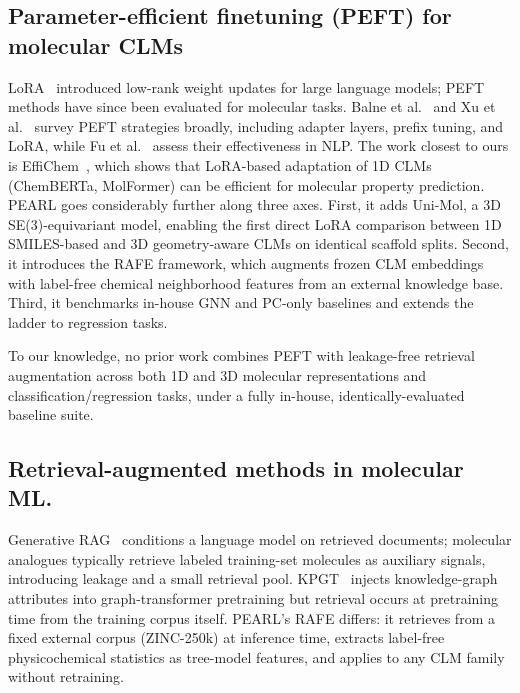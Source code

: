 \documentclass[final,1p,times]{elsarticle}
\begin{document}
\subsection{Parameter-efficient finetuning (PEFT) for molecular CLMs} \label{PEFT}
LoRA~\cite{hu2021lora} introduced low-rank weight updates for large language models; PEFT methods have since been evaluated for molecular tasks.
Balne et al.~\cite{balne2024peft} and Xu et al.~\cite{xu2023peftreview} survey PEFT strategies broadly, including adapter layers, prefix tuning, and LoRA, while
Fu et al.~\cite{fu2023effectiveness} assess their effectiveness in NLP.
The work closest to ours is EffiChem~\cite{harod2025effichem}, which shows that LoRA-based adaptation of 1D CLMs (ChemBERTa, MolFormer) can be efficient for molecular property prediction.
PEARL goes considerably further along three axes. First, it adds Uni-Mol, a 3D SE(3)-equivariant model, enabling the first direct LoRA comparison between 1D SMILES-based and 3D geometry-aware CLMs on identical scaffold splits. Second, it introduces the RAFE framework, which augments frozen CLM embeddings with label-free chemical neighborhood features from an external knowledge base. Third, it benchmarks in-house GNN and PC-only baselines and extends the ladder to regression tasks.

To our knowledge, no prior work combines PEFT with leakage-free retrieval augmentation across both 1D and 3D molecular representations and classification/regression tasks, under a fully in-house, identically-evaluated baseline suite.

\subsection{Retrieval-augmented methods in molecular ML.} \label{RAG}
Generative RAG~\cite{lewis2020rag} conditions a language model on retrieved documents; molecular analogues typically retrieve labeled training-set molecules as auxiliary signals, introducing leakage and a small retrieval pool.
KPGT~\cite{liu2022kpgt} injects knowledge-graph attributes into graph-transformer pretraining but retrieval occurs at pretraining time from the training corpus itself.
PEARL's RAFE differs: it retrieves from a fixed external corpus (ZINC-250k) at inference time, extracts label-free physicochemical statistics as tree-model features, and applies to any CLM family without retraining.
\end{document}
